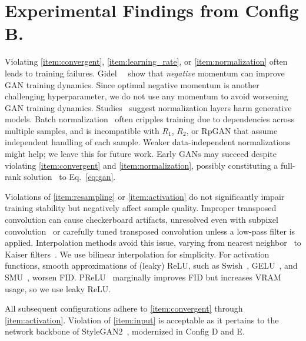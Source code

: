 


\section{Experimental Findings from Config B.}
Violating \ref{item:convergent}, \ref{item:learning_rate}, or \ref{item:normalization} often leads to training failures.
Gidel~\etal~\cite{ganmomentum} show that \emph{negative} momentum can improve GAN training dynamics. Since optimal negative momentum is another challenging hyperparameter, we do not use any momentum to avoid worsening GAN training dynamics. Studies~\cite{sg2,edm2} suggest normalization layers harm generative models. Batch normalization~\cite{bn} often cripples training due to dependencies across multiple samples, and is incompatible with $R_1$, $R_2$, or RpGAN that assume independent handling of each sample. Weaker data-independent normalizations~\cite{sg2,edm2} might help; we leave this for future work. Early GANs may succeed despite violating \ref{item:convergent} and \ref{item:normalization}, possibly constituting a full-rank solution~\cite{r1} to Eq.~\ref{eq:gan}.

Violations of \ref{item:resampling} or \ref{item:activation} do not significantly impair training stability but negatively affect sample quality. Improper transposed convolution can cause checkerboard artifacts, unresolved even with subpixel convolution~\cite{subpixel} or carefully tuned transposed convolution unless a low-pass filter is applied. Interpolation methods avoid this issue, varying from nearest neighbor~\cite{pggan} to Kaiser filters~\cite{sg3}. We use bilinear interpolation for simplicity. For activation functions, smooth approximations of (leaky) ReLU, such as Swish~\cite{swish}, GELU~\cite{gelu}, and SMU~\cite{smu}, worsen FID. PReLU~\cite{prelu} marginally improves FID but increases VRAM usage, so we use leaky ReLU.

All subsequent configurations adhere to \ref{item:convergent} through \ref{item:activation}. Violation of \ref{item:input} is acceptable as it pertains to the network backbone of StyleGAN2~\cite{sg2}, modernized in Config D and E.


